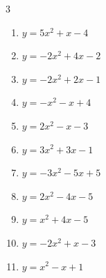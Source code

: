 \begin{multicols}{3}
\begin{enumerate}
  \item $\displaystyle y=5x^{2}+x-4$


  \item $\displaystyle y=-2x^{2}+4x-2$

        \phantom{$\displaystyle 頂点\left( 1 , 0 \right)$}

  \item $\displaystyle y=-2x^{2}+2x-1$


\columnbreak %

\resetques

  \item $\displaystyle y=-x^{2}-x+4$


  \item $\displaystyle y=2x^{2}-x-3$


  \item $\displaystyle y=3x^{2}+3x-1$


  \item $\displaystyle y=-3x^{2}-5x+5$


  \item $\displaystyle y=2x^{2}-4x-5$

        \phantom{$\displaystyle 頂点\left( 1 , -7 \right)$}

\columnbreak %

  \item $\displaystyle y=x^{2}+4x-5$

        \phantom{$\displaystyle 頂点\left( -2 , -9 \right)$}

  \item $\displaystyle y=-2x^{2}+x-3$


  \item $\displaystyle y=x^{2}-x+1$


\end{enumerate}
\end{multicols}
